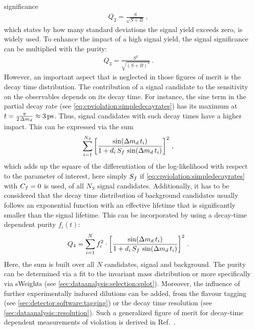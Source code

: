 significance
\begin{align}
	Q_2 = \frac{S}{\sqrt{S + B}}\,,
\end{align}
which states by how many standard deviations the signal yield exceeds zero, is
widely used. To enhance the impact of a high signal yield, the signal
significance can be multiplied with the purity:
\begin{align}
	Q_3 = \frac{S^2}{\sqrt{(S + B)^3}}\,.
\end{align}
However, an important aspect that is neglected in those figures of merit is
the decay time distribution. The contribution of a signal candidate to the
sensitivity on the \CP observables depends on its decay time. For instance,
the sine term in the partial decay rate (see
\cref{eq:cpviolation:simpledecayrates}) has its maximum at $t =
\frac{\pi}{2\,\dmd} \approx \SI{3}{\ps}$. Thus, signal candidates with such
decay times have a higher impact. This can be expressed via the sum
\begin{align}
	\sum_{i=1}^{N_S} \left[\frac{\sin({\Delta m_{{d}}}\,t_i)}{1 + d_i\,S_f\,\sin({\Delta m_{{d}}}\,t_i)}\right]^2\,,
\end{align}
which adds up the square of the differentiation of the log-likelihood
with respect to the parameter of interest, here simply $S_{f}$ if
\cref{eq:cpviolation:simpledecayrates} with $C_{f} = 0$ is used, of all
$N_S$ signal candidates. Additionally, it has to be considered that the decay
time distribution of background candidates usually follows an exponential
function with an effective lifetime that is significantly smaller than the \Bd
signal lifetime. This can be incorporated by using a decay-time dependent
purity $f_i(t)$:
\begin{align}
	Q_4 = \sum_{i=1}^{N} f_i^2 \cdot \left[\frac{\sin({\Delta m_{{d}}}\,t_i)}{1 + d_i\,S_f\,\sin({\Delta m_{{d}}}\,t_i)}\right]^2\,.
\end{align}
Here, the sum is built over all $N$ candidates, signal and background. The
purity can be determined via a fit to the invariant mass distribution or more
specifically via sWeights (see \cref{sec:dataanalysis:selection:splot}).
Moreover, the influence of further experimentally induced dilutions can be
added, \eg from the flavour tagging (see \cref{sec:detector:software:tagging})
or the decay time resolution (see \cref{sec:dataanalysis::resolution}). Such a
generalized figure of merit for decay-time dependent measurements of
\CP violation is derived in Ref.~\cite{FOM}.